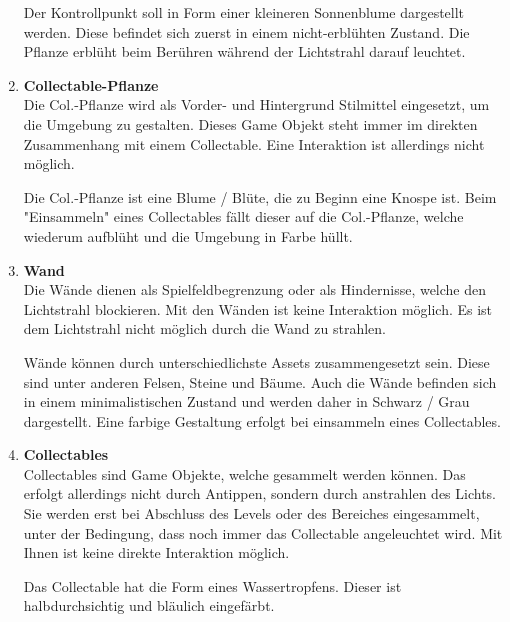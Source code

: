 \begin{enumerate}
Der Kontrollpunkt soll in Form einer kleineren Sonnenblume dargestellt werden. Diese befindet sich zuerst in einem nicht-erblühten Zustand. Die Pflanze erblüht beim Berühren während der Lichtstrahl darauf leuchtet. 

\item \textbf{Collectable-Pflanze} \hfill \\
Die Col.-Pflanze wird als Vorder- und Hintergrund Stilmittel eingesetzt, um die Umgebung zu gestalten. Dieses Game Objekt steht immer im direkten Zusammenhang mit einem Collectable. Eine Interaktion ist allerdings nicht möglich.

Die Col.-Pflanze ist eine Blume / Blüte, die zu Beginn eine Knospe ist. Beim "{}Einsammeln"{} eines Collectables fällt dieser auf die Col.-Pflanze, welche wiederum aufblüht und die Umgebung in Farbe hüllt. 


\item \textbf{Wand} \hfill \\
Die Wände dienen als Spielfeldbegrenzung oder als Hindernisse, welche den Lichtstrahl blockieren. Mit den Wänden ist keine Interaktion möglich. Es ist dem Lichtstrahl nicht möglich durch die Wand zu strahlen.

Wände können durch unterschiedlichste Assets zusammengesetzt sein. Diese sind unter anderen Felsen, Steine und Bäume. Auch die Wände befinden sich in einem minimalistischen Zustand und werden daher in Schwarz / Grau dargestellt. Eine farbige Gestaltung erfolgt bei einsammeln eines Collectables.

\item \textbf{Collectables} \hfill \\
Collectables sind Game Objekte, welche gesammelt werden können. Das erfolgt allerdings nicht durch Antippen, sondern durch anstrahlen des Lichts. Sie werden erst bei Abschluss des Levels oder des Bereiches eingesammelt, unter der Bedingung, dass noch immer das Collectable angeleuchtet wird. Mit Ihnen ist keine direkte Interaktion möglich. 

Das Collectable hat die Form eines Wassertropfens. Dieser ist halbdurchsichtig und bläulich eingefärbt. 

%

\end{enumerate}
